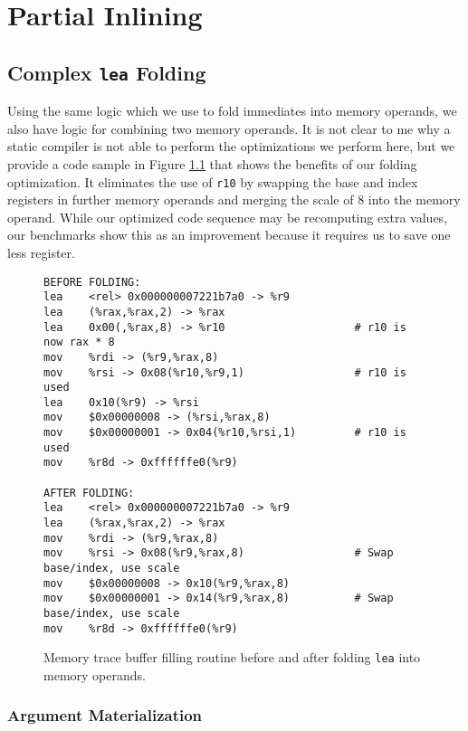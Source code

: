\chapter{Partial Inlining}
\label{sec:partial_inlining}

\section{Complex {\tt lea} Folding}
\label{sec:complex_lea_folding}

Using the same logic which we use to fold immediates into memory operands, we
also have logic for combining two memory operands.  It is not clear to me why a
static compiler is not able to perform the optimizations we perform here, but we
provide a code sample in Figure \ref{fig:fold_lea} that shows the benefits of
our folding optimization.  It eliminates the use of {\tt r10} by swapping the
base and index registers in further memory operands and merging the scale of 8
into the memory operand.  While our optimized code sequence may be recomputing
extra values, our benchmarks show this as an improvement because it requires us
to save one less register.

\begin{figure}
\begin{verbatim}
BEFORE FOLDING:
lea    <rel> 0x000000007221b7a0 -> %r9
lea    (%rax,%rax,2) -> %rax
lea    0x00(,%rax,8) -> %r10                    # r10 is now rax * 8
mov    %rdi -> (%r9,%rax,8)
mov    %rsi -> 0x08(%r10,%r9,1)                 # r10 is used
lea    0x10(%r9) -> %rsi
mov    $0x00000008 -> (%rsi,%rax,8)
mov    $0x00000001 -> 0x04(%r10,%rsi,1)         # r10 is used
mov    %r8d -> 0xffffffe0(%r9)

AFTER FOLDING:
lea    <rel> 0x000000007221b7a0 -> %r9
lea    (%rax,%rax,2) -> %rax
mov    %rdi -> (%r9,%rax,8)
mov    %rsi -> 0x08(%r9,%rax,8)                 # Swap base/index, use scale
mov    $0x00000008 -> 0x10(%r9,%rax,8)
mov    $0x00000001 -> 0x14(%r9,%rax,8)          # Swap base/index, use scale
mov    %r8d -> 0xffffffe0(%r9)
\end{verbatim}
\caption{Memory trace buffer filling routine before and after folding {\tt lea}
into memory operands.}
\label{fig:fold_lea}
\end{figure}


\subsection{Argument Materialization}

